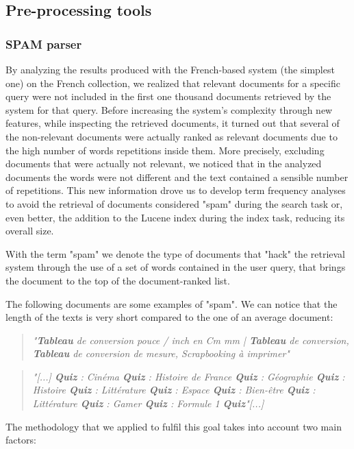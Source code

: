 \subsection{Pre-processing tools}
\label{subsec:preprocess}
\subsubsection{SPAM parser}
\label{subsubsec:spam}
By analyzing the results produced with the French-based system (the simplest one) on the French collection, we realized that relevant documents for a specific query were not included in the first one thousand documents retrieved by the system for that query. Before increasing the system's complexity through new features, while inspecting the retrieved documents, it turned out that several of the non-relevant documents were actually ranked as relevant documents due to the high number of words repetitions inside them. More precisely, excluding documents that were actually not relevant, we noticed that in the analyzed documents the words were not different and the text contained a sensible number of repetitions. This new information drove us to develop term frequency analyses to avoid the retrieval of documents considered "spam" during the search task or, even better, the addition to the Lucene index during the index task, reducing its overall size.  
\par
With the term "spam" we denote the type of documents that "hack" the retrieval system through the use of a set of words contained in the user query, that brings the document to the top of the document-ranked list.   
\par
The following documents are some examples of "spam". We can notice that the length of the texts is very short compared to the one of an average document: 
\begin{quote}
    \centering \textit{"\textbf{Tableau} de conversion pouce / inch en Cm mm | \textbf{Tableau} de conversion, \textbf{Tableau} de conversion de mesure, Scrapbooking à imprimer"} 
\end{quote}
\begin{quote}
    \centering  \textit{"[...] \textbf{Quiz} : Cinéma \textbf{Quiz} : Histoire de France \textbf{Quiz} : Géographie \textbf{Quiz} : Histoire \textbf{Quiz} : Littérature \textbf{Quiz} : Espace \textbf{Quiz} : Bien-être \textbf{Quiz} : Littérature \textbf{Quiz} : Gamer \textbf{Quiz} : Formule 1 \textbf{Quiz}"[...] }
\end{quote}
The methodology that we applied to fulfil this goal takes into account two main factors:  
